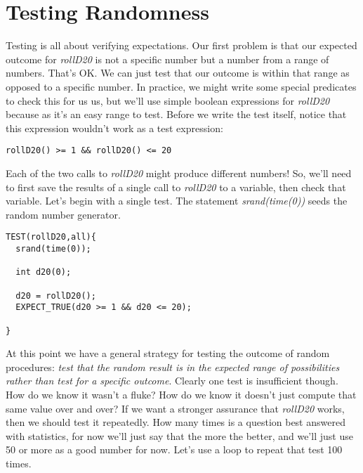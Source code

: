 \documentclass[]{tufte-handout}
\begin{document}
\section{Testing Randomness}

Testing is all about verifying expectations.  Our first problem is that our expected outcome for \textit{rollD20} is not a specific number but a number from a range of numbers. That's OK. We can just test that our outcome is within that range as opposed to a specific number. In practice, we might write some special predicates to check this for us us, but we'll use simple boolean expressions for \textit{rollD20} because as it's an easy range to test. Before we write the test itself, notice that this expression wouldn't work as a test expression:
\begin{verbatim}
rollD20() >= 1 && rollD20() <= 20
\end{verbatim}

Each of the two calls to \textit{rollD20} might produce different numbers! So, we'll need to first save the results of a single call to \textit{rollD20} to a variable, then check that variable.  Let's begin with a single test. The statement \textit{srand(time(0))} seeds the random number generator. 

\begin{verbatim}
TEST(rollD20,all){
  srand(time(0));

  int d20(0);
  
  d20 = rollD20();
  EXPECT_TRUE(d20 >= 1 && d20 <= 20);
  
}
\end{verbatim}

At this point we have a general strategy for testing the outcome of random procedures: \textit{test that the random result is in the expected range of possibilities rather than test for a specific outcome}. Clearly one test is insufficient though. How do we know it wasn't a fluke? How do we know it doesn't just compute that same value over and over?  If we want a stronger assurance that \textit{rollD20} works, then we should test it repeatedly. How many times is a question best answered with statistics, for now we'll just say that the more the better, and we'll just use 50 or more as a good number for now.  Let's use a loop to repeat that test 100 times.
\end{document}
